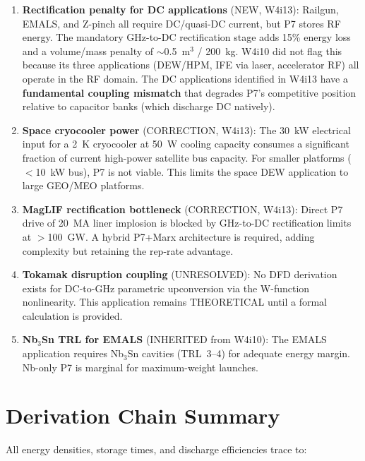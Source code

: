 \documentclass[11pt]{article}
\begin{document}
\begin{enumerate}
\item \textbf{Rectification penalty for DC applications} (NEW, W4i13):
  Railgun, EMALS, and Z-pinch all require DC/quasi-DC current, but P7
  stores RF energy. The mandatory GHz-to-DC rectification stage adds
  15\% energy loss and a volume/mass penalty of $\sim$0.5~m$^3$ /
  200~kg. W4i10 did not flag this because its three applications
  (DEW/HPM, IFE via laser, accelerator RF) all operate in the RF domain.
  The DC applications identified in W4i13 have a \textbf{fundamental
  coupling mismatch} that degrades P7's competitive position relative to
  capacitor banks (which discharge DC natively).

\item \textbf{Space cryocooler power} (CORRECTION, W4i13): The 30~kW
  electrical input for a 2~K cryocooler at 50~W cooling capacity
  consumes a significant fraction of current high-power satellite
  bus capacity. For smaller platforms ($<$10~kW bus), P7 is not viable.
  This limits the space DEW application to large GEO/MEO platforms.

\item \textbf{MagLIF rectification bottleneck} (CORRECTION, W4i13):
  Direct P7 drive of 20~MA liner implosion is blocked by
  GHz-to-DC rectification limits at $>$100~GW. A hybrid
  P7+Marx architecture is required, adding complexity but
  retaining the rep-rate advantage.

\item \textbf{Tokamak disruption coupling} (UNRESOLVED): No DFD
  derivation exists for DC-to-GHz parametric upconversion via
  the W-function nonlinearity. This application remains THEORETICAL
  until a formal calculation is provided.

\item \textbf{Nb$_3$Sn TRL for EMALS} (INHERITED from W4i10):
  The EMALS application requires Nb$_3$Sn cavities (TRL~3--4) for
  adequate energy margin. Nb-only P7 is marginal for maximum-weight
  launches.
\end{enumerate}

\section{Derivation Chain Summary}

All energy densities, storage times, and discharge efficiencies trace to:
\end{document}
